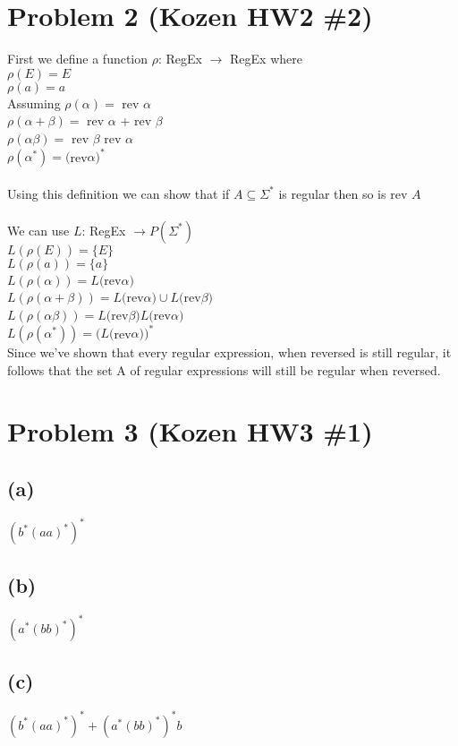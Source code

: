 \documentclass[11pt, a4paper, oneside]{article}
\begin{document}
\section*{Problem 2 (Kozen HW2 \#2)}
First we define a function $\rho$: RegEx $\rightarrow$ RegEx where\\
$\rho(E) = E$\\  
$\rho(a) = a$\\
Assuming $\rho(\alpha) =$ rev $\alpha$\\
$\rho(\alpha + \beta) =$ rev $\alpha$ + rev $\beta$\\
$\rho(\alpha\beta)=$ rev $\beta$ rev $\alpha$\\
$\rho(\alpha^*) = ($rev$\alpha)^*$\\
\\
Using this definition we can show that if $A\subseteq\Sigma^*$ is regular 
then so is rev $A$\\
\\
We can use $L$: RegEx $\rightarrow P(\Sigma^*)$\\
$L(\rho(E)) = \{E\}$\\
$L(\rho(a)) = \{a\}$\\
$L(\rho(\alpha)) = L($rev$\alpha)$\\
$L(\rho(\alpha + \beta)) = L($rev$\alpha) \cup L($rev$\beta)$\\
$L(\rho(\alpha\beta)) = L($rev$\beta)L($rev$\alpha)$\\
$L(\rho(\alpha^*)) = (L($rev$\alpha))^*$\\
Since we've shown that every regular expression, when reversed is still regular, it follows that the set A of regular expressions will still be regular when reversed.

\section*{Problem 3 (Kozen HW3 \#1)}
\subsection*{(a)}
$(b^*(aa)^*)^*$

\subsection*{(b)}
$(a^*(bb)^*)^*$

\subsection*{(c)}
$(b^*(aa)^*)^* + (a^*(bb)^*)^*b$
\end{document}
